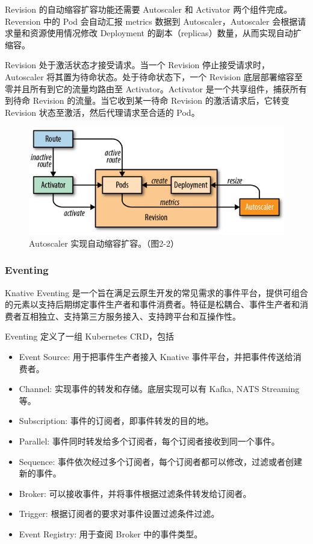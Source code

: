\documentclass[11pt]{article}
\begin{document}
Revision 的自动缩容扩容功能还需要 Autoscaler 和 Activator 两个组件完成\cite{mcclain2019getting}。Reversion 中的 Pod 会自动汇报 metrics 数据到 Autoscaler，Autoscaler 会根据请求量和资源使用情况修改 Deployment 的副本（replicas）数量，从而实现自动扩缩容。


Revision 处于激活状态才接受请求。当一个 Revision 停止接受请求时，Autoscaler 将其置为待命状态。处于待命状态下，一个 Revision 底层部署缩容至零并且所有到它的流量均路由至 Activator。Activator 是一个共享组件，捕获所有到待命 Revision 的流量。当它收到某一待命 Revision 的激活请求后，它转变 Revision 状态至激活，然后代理请求至合适的 Pod。
\begin{figure}[!htbp]
	\centering
	\includegraphics[width=1.0\textwidth]{figs/knative-autoscaler.png}
	\caption{Autoscaler 实现自动缩容扩容。（\cite{mcclain2019getting}图2-2）}
	\label{knative-autoscaler}
\end{figure}

\subsubsection{Eventing}
Knative Eventing 是一个旨在满足云原生开发的常见需求的事件平台，提供可组合的元素以支持后期绑定事件生产者和事件消费者。特征是松耦合、事件生产者和消费者互相独立、支持第三方服务接入、支持跨平台和互操作性\cite{knative-eventing}。


Eventing 定义了一组 Kubernetes CRD，包括
\begin{itemize}
	\item Event Source: 用于把事件生产者接入 Knative 事件平台，并把事件传送给消费者。
	\item Channel: 实现事件的转发和存储。底层实现可以有 Kafka, NATS Streaming 等。
	\item Subscription: 事件的订阅者，即事件转发的目的地。
	\item Parallel: 事件同时转发给多个订阅者，每个订阅者接收到同一个事件。
	\item Sequence: 事件依次经过多个订阅者，每个订阅者都可以修改，过滤或者创建新的事件。
	\item Broker: 可以接收事件，并将事件根据过滤条件转发给订阅者。
	\item Trigger: 根据订阅者的要求对事件设置过滤条件过滤。
	\item Event Registry: 用于查阅 Broker 中的事件类型。
\end{itemize}
\end{document}
